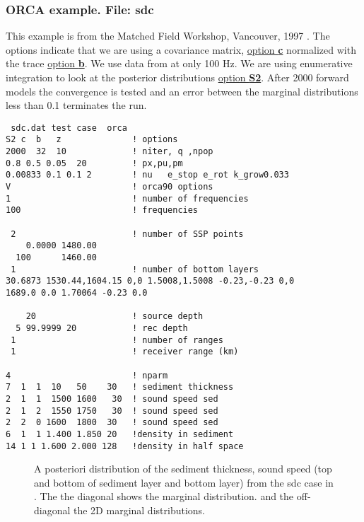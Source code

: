 \documentclass{saclantc}
\begin{document}
\subsubsection{ORCA example. File: {\bf sdc}}

\label{se:sdc} 
This example is from the Matched Field Workshop,
Vancouver, 1997 \cite{chapman}.
The options indicate that we are using a covariance matrix, 
\underline{option {\bf c}} normalized with the trace
\underline{option {\bf b}}. We use data from at only 100 Hz. We are using enumerative integration to
look at the posterior distributions \underline{option {\bf S2}}.
After  2000 forward models the convergence is tested and an error
between the marginal distributions less
than 0.1 terminates the run.

\small
\begin{verbatim}
 sdc.dat test case  orca
S2 c  b   z              ! options 
2000  32  10             ! niter, q ,npop
0.8 0.5 0.05  20         ! px,pu,pm
0.00833 0.1 0.1 2        ! nu   e_stop e_rot k_grow0.033 
V                        ! orca90 options
1                        ! number of frequencies
100                      ! frequencies

 2                       ! number of SSP points
    0.0000 1480.00    
  100      1460.00
 1                       ! number of bottom layers
30.6873 1530.44,1604.15 0,0 1.5008,1.5008 -0.23,-0.23 0,0
1689.0 0.0 1.70064 -0.23 0.0

    20                   ! source depth
  5 99.9999 20           ! rec depth
 1                       ! number of ranges
 1                       ! receiver range (km)

4                        ! nparm                 
7  1  1  10   50    30   ! sediment thickness
2  1  1  1500 1600   30  ! sound speed sed  
2  1  2  1550 1750   30  ! sound speed sed 
2  2  0 1600  1800  30   ! sound speed sed
6  1  1 1.400 1.850 20   !density in sediment
14 1 1 1.600 2.000 128   !density in half space
\end{verbatim}
\normalsize
\begin{figure}
\epsfxsize=14cm
\centerline{}
\caption{A posteriori distribution of the sediment thickness, sound
  speed (top and bottom of sediment layer and bottom layer) from the
  sdc case in \cite{chapman}. The the diagonal shows the marginal
  distribution. and the off-diagonal the 2D marginal distributions. }
\label{fig:sdc20orca}
\end{figure}
\end{document}
